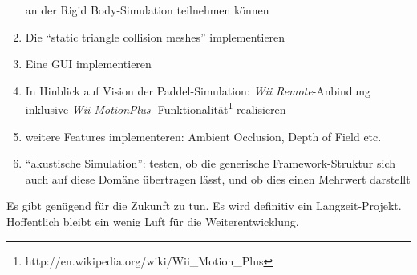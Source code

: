 \begin{enumerate}
		an der Rigid Body-Simulation teilnehmen können
		\item Die "`static triangle collision meshes"' implementieren
		\item Eine GUI implementieren
		\item In Hinblick auf Vision der Paddel-Simulation: \emph{Wii Remote}-Anbindung inklusive \emph{Wii MotionPlus}-
		Funktionalität\footnote{http://en.wikipedia.org/wiki/Wii\_Motion\_Plus} realisieren
		\item weitere Features implementeren: Ambient Occlusion, Depth of Field etc.
		\item "`akustische Simulation"': testen, ob die generische Framework-Struktur sich auch auf diese Domäne
			übertragen lässt, und ob dies einen Mehrwert darstellt
	\end{enumerate}

	Es gibt genügend für die Zukunft zu tun. Es wird definitiv ein Langzeit-Projekt.
	Hoffentlich bleibt ein wenig Luft für die Weiterentwicklung.


\clearpage
